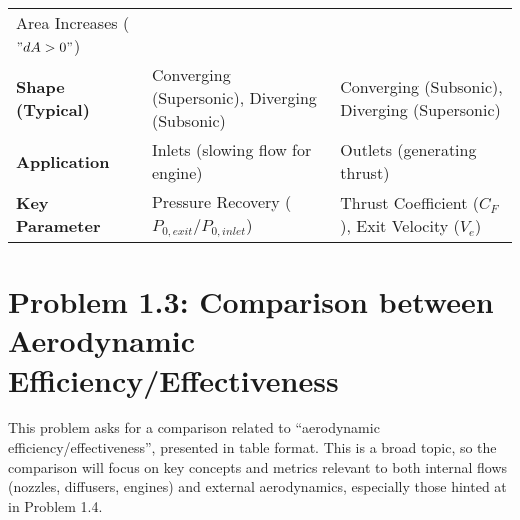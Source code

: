 \begin{longtable}[]{@{}lll@{}}
\begin{minipage}[t]{0.39\columnwidth}
Area Increases (\("dA > 0"\))\strut
\end{minipage}\tabularnewline
\begin{minipage}[t]{0.15\columnwidth}\raggedright
\textbf{Shape (Typical)}\strut
\end{minipage} & \begin{minipage}[t]{0.38\columnwidth}\raggedright
Converging (Supersonic), Diverging (Subsonic)\strut
\end{minipage} & \begin{minipage}[t]{0.39\columnwidth}\raggedright
Converging (Subsonic), Diverging (Supersonic)\strut
\end{minipage}\tabularnewline
\begin{minipage}[t]{0.15\columnwidth}\raggedright
\textbf{Application}\strut
\end{minipage} & \begin{minipage}[t]{0.38\columnwidth}\raggedright
Inlets (slowing flow for engine)\strut
\end{minipage} & \begin{minipage}[t]{0.39\columnwidth}\raggedright
Outlets (generating thrust)\strut
\end{minipage}\tabularnewline
\begin{minipage}[t]{0.15\columnwidth}\raggedright
\textbf{Key Parameter}\strut
\end{minipage} & \begin{minipage}[t]{0.38\columnwidth}\raggedright
Pressure Recovery (\(P_{0,exit}/P_{0,inlet}\))\strut
\end{minipage} & \begin{minipage}[t]{0.39\columnwidth}\raggedright
Thrust Coefficient (\(C_F\)), Exit Velocity (\(V_e\))\strut
\end{minipage}\tabularnewline
\bottomrule
\end{longtable}

\hypertarget{problem-1.3-comparison-between-aerodynamic-efficiencyeffectiveness}{%
\section{Problem 1.3: Comparison between Aerodynamic
Efficiency/Effectiveness}\label{problem-1.3-comparison-between-aerodynamic-efficiencyeffectiveness}}

This problem asks for a comparison related to ``aerodynamic
efficiency/effectiveness'', presented in table format. This is a broad
topic, so the comparison will focus on key concepts and metrics relevant
to both internal flows (nozzles, diffusers, engines) and external
aerodynamics, especially those hinted at in Problem 1.4.

